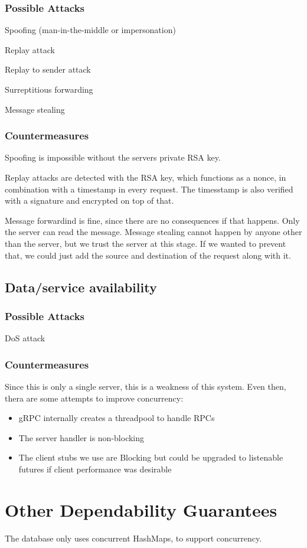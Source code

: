 \documentclass[10pt,twocolumn]{article}
\begin{document}
\subsubsection*{Possible Attacks}

Spoofing (man-in-the-middle or impersonation)

Replay attack

Replay to sender attack

Surreptitious forwarding

Message stealing

\subsubsection*{Countermeasures}

Spoofing is impossible without the servers private RSA key.

Replay attacks are detected with the RSA key, which functions as a nonce, in combination with a timestamp in every request.
The timesstamp is also verified with a signature and encrypted on top of that.

Message forwardind is fine, since there are no consequences if that happens. Only the server can read the message.
Message stealing cannot happen by anyone other than the server, but we trust the server at this stage.
If we wanted to prevent that, we could just add the source and destination of the request along with it.

\subsection{Data/service availability}

\subsubsection*{Possible Attacks}

DoS attack

\subsubsection*{Countermeasures}

Since this is only a single server, this is a weakness of this system.
Even then, thera are some attempts to improve concurrency:
\begin{itemize}
    \item gRPC internally creates a threadpool to handle RPCs
    \item The server handler is non-blocking
    \item The client stubs we use are Blocking but could be upgraded to listenable futures if client performance was desirable
\end{itemize}

\section{Other Dependability Guarantees}

The database only uses concurrent HashMaps, to support concurrency.
\end{document}
